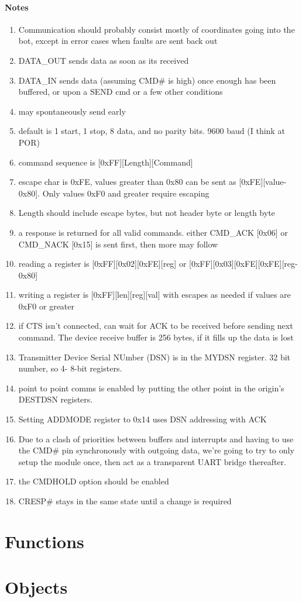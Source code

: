 \documentclass{scrreprt}
\begin{document}
	\paragraph{Notes}
	\begin{enumerate}
		\item Communication should probably consist mostly of coordinates going into the bot, except in error cases when faults are sent back out
		\item DATA\_OUT sends data as soon as its received
		\item DATA\_IN sends data (assuming CMD\# is high) once enough has been buffered, or upon a SEND cmd or a few other conditions
		\item may spontaneously send early
		\item default is 1 start, 1 stop, 8 data, and no parity bits.  9600 baud (I think at POR)
		\item command sequence is [0xFF][Length][Command]
		\item escape char is 0xFE, values greater than 0x80 can be sent as [0xFE][value-0x80].  Only values 0xF0 and greater require escaping
		\item Length should include escape bytes, but not header byte or length byte
		\item a response is returned for all valid commands.  either CMD\_ACK [0x06] or CMD\_NACK [0x15] is sent first, then more may follow
		\item reading a register is [0xFF][0x02][0xFE][reg] or [0xFF][0x03][0xFE][0xFE][reg-0x80]
		\item writing a register is [0xFF][len][reg][val]  with escapes as needed if values are 0xF0 or greater
		\item if CTS isn't connected, can wait for ACK to be received before sending next command.  The device receive buffer is 256 bytes, if it fills up the data is lost
		\item Transmitter Device Serial NUmber (DSN) is in the MYDSN register.  32 bit number, so 4- 8-bit registers.
		\item point to point comms is enabled by putting the other point in the origin's DESTDSN registers.
		\item Setting ADDMODE register to 0x14 uses DSN addressing with ACK
		\item Due to a clash of priorities between buffers and interrupts and having to use the CMD# pin synchronously with outgoing data, we're going to try to only setup the module once, then act as a transparent UART bridge thereafter.
		\item the CMDHOLD option should be enabled
		\item CRESP# stays in the same state until a change is required
	\end{enumerate}
	\section{Functions}
	
	\section{Objects}
	
\end{document}
